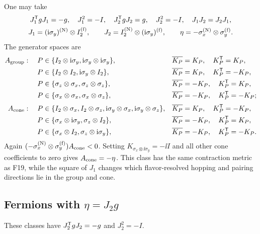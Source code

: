 One may take
\begin{equation}
\begin{gathered}
J_1^{\mathsf{T}} gJ_1=-g,\quad J_1^2=-I,\quad
J_2^{\mathsf{T}} gJ_2=g,\quad J_2^2=-I,\quad
J_1J_2=J_2J_1,\\
J_1=(\mathrm{i}\sigma_y)^{({\rm N})}\otimes I_2^{({\rm f})},\qquad
J_2=I_2^{({\rm N})}\otimes(\mathrm{i}\sigma_y)^{({\rm f})},\qquad
\eta=-\sigma_x^{({\rm N})}\otimes\sigma_y^{({\rm f})}.
\end{gathered}
\end{equation}
The generator spaces are
\begin{align*}
A_{\rm group}:\quad
P&\in\{I_2\otimes\mathrm{i}\sigma_y,\mathrm{i}\sigma_y\otimes\mathrm{i}\sigma_y\},
&&\overline{K_P}=K_P,\quad K_P^{\mathsf{T}}=K_P,\\
P&\in\{I_2\otimes I_2,\mathrm{i}\sigma_y\otimes I_2\},
&&\overline{K_P}=K_P,\quad K_P^{\mathsf{T}}=-K_P,\\
P&\in\{\sigma_z\otimes\sigma_x,\sigma_z\otimes\sigma_z\},
&&\overline{K_P}=-K_P,\quad K_P^{\mathsf{T}}=K_P,\\
P&\in\{\sigma_x\otimes\sigma_x,\sigma_x\otimes\sigma_z\},
&&\overline{K_P}=-K_P,\quad K_P^{\mathsf{T}}=-K_P;\\[2pt]
A_{\rm cone}:\quad
P&\in\{I_2\otimes\sigma_x,I_2\otimes\sigma_z,
\mathrm{i}\sigma_y\otimes\sigma_x,\mathrm{i}\sigma_y\otimes\sigma_z\},
&&\overline{K_P}=K_P,\quad K_P^{\mathsf{T}}=-K_P,\\
P&\in\{\sigma_x\otimes\mathrm{i}\sigma_y,\sigma_z\otimes I_2\},
&&\overline{K_P}=-K_P,\quad K_P^{\mathsf{T}}=K_P,\\
P&\in\{\sigma_x\otimes I_2,\sigma_z\otimes\mathrm{i}\sigma_y\},
&&\overline{K_P}=-K_P,\quad K_P^{\mathsf{T}}=-K_P.
\end{align*}
Again \((-\sigma_x^{({\rm N})}\otimes\sigma_y^{({\rm f})})A_{\rm cone}<0\).  Setting
\(K_{\sigma_x\otimes\ii\sigma_y}=-\ii I\) and all other cone coefficients to zero gives \(A_{\rm cone}=-\eta\).  This class has the same contraction metric as F19, while the square of \(J_1\) changes which flavor-resolved hopping and pairing directions lie in the group and cone.

\subsection{Fermions with \texorpdfstring{\(\eta=J_2g\)}{eta = J2 g}}

These classes have \(J_2^{\mathsf{T}} gJ_2=-g\) and \(J_2^2=-I\).

